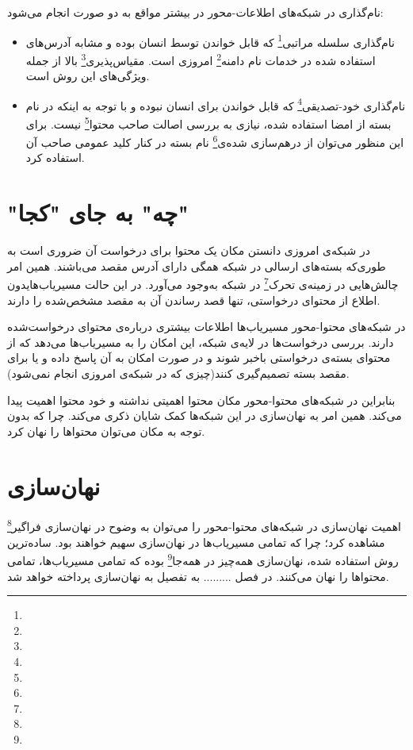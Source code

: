 نام‌گذاری در شبکه‌های اطلاعات-محور در بیشتر مواقع به دو صورت انجام می‌شود:

\begin{itemize}
	\item نام‌گذاری سلسله مراتبی\footnote{}
	که قابل خواندن توسط انسان بوده و مشابه آدرس‌های استفاده شده در خدمات نام دامنه\footnote{} امروزی است. مقیاس‌پذیری\footnote{} بالا از جمله ویژگی‌های این روش است.
	\item نام‌گذاری خود-تصدیقی\footnote{}
	که قابل خواندن برای انسان نبوده و با توجه به اینکه در نام بسته از امضا استفاده شده، نیازی به بررسی اصالت صاحب محتوا\footnote{} نیست. برای این منظور می‌توان از درهم‌سازی شده‌ی\footnote{} نام بسته در کنار کلید عمومی صاحب آن استفاده کرد.
	
\end{itemize}

\section{"چه" به جای "کجا"}
در شبکه‌ی امروزی دانستن مکان یک محتوا برای درخواست آن ضروری است به طوری‌که بسته‌های ارسالی در شبکه همگی دارای آدرس  مقصد می‌باشند. همین امر چالش‌هایی در زمینه‌ی تحرک\footnote{} در شبکه به‌وجود می‌آورد. در این حالت مسیریاب‌هایدون اطلاع از محتوای درخواستی، تنها قصد رساندن آن به مقصد مشخص‌شده را دارند.

در شبکه‌های محتوا-محور مسیریاب‌ها اطلاعات بیشتری درباره‌ی محتوای درخواست‌شده دارند. بررسی درخواست‌ها در لایه‌ی شبکه، این امکان را به مسیریاب‌ها می‌دهد که از محتوای بسته‌ی درخواستی با‌خبر شوند و در صورت امکان به آن پاسخ داده و یا برای مقصد بسته تصمیم‌گیری کنند(چیزی که در شبکه‌ی امروزی انجام نمی‌شود).

بنابراین در شبکه‌های محتوا-محور مکان محتوا اهمیتی نداشته و خود محتوا اهمیت پیدا می‌کند. همین امر به نهان‌سازی در این شبکه‌ها کمک شایان ذکری می‌کند. چرا که بدون توجه به مکان می‌توان محتواها را نهان کرد.

\section{نهان‌سازی}
اهمیت نهان‌سازی در شبکه‌های محتوا-محور را می‌توان به وضوح در نهان‌سازی فراگیر\footnote{} مشاهده کرد؛ چرا که تمامی مسیریاب‌ها در نهان‌سازی سهیم خواهند بود. ساده‌ترین روش استفاده شده، نهان‌سازی همه‌چیز در همه‌جا\footnote{} بوده که تمامی مسیریاب‌ها، تمامی محتواها را نهان می‌کنند. در فصل ......... به تفصیل به نهان‌سازی پرداخته خواهد شد.



